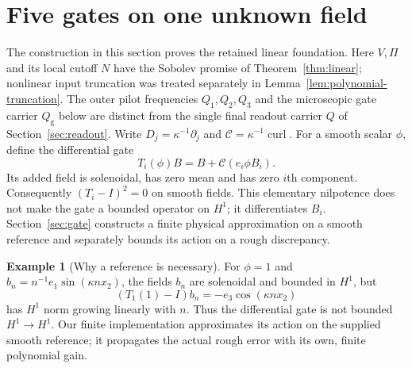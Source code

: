 \documentclass[11pt,a4paper]{amsart}
\theoremstyle{definition}
\newtheorem{example}[theorem]{Example}
\theoremstyle{remark}
\numberwithin{equation}{section}
\newcommand{\curl}{\operatorname{curl}}
\begin{document}
\section{Five gates on one unknown field}\label{sec:algebra}
The construction in this section proves the retained linear foundation. Here
$V,\Pi$ and its local cutoff $N$ have the Sobolev promise of
Theorem~\ref{thm:linear}; nonlinear input truncation was treated separately in
Lemma~\ref{lem:polynomial-truncation}. The outer pilot frequencies $Q_1,Q_2,Q_3$
and the microscopic gate carrier $Q_{\mathrm g}$ below are distinct from the
single final readout carrier $Q$ of Section~\ref{sec:readout}.
Write $D_j=\kappa^{-1}\partial_j$ and $\mathscr C=\kappa^{-1}\curl$.
For a smooth scalar $\phi$, define the differential gate
\begin{equation}\label{eq:gate}
 T_i(\phi)B=B+\mathscr C(e_i\phi B_i).
\end{equation}
Its added field is solenoidal, has zero mean and has zero $i$th component.
Consequently $(T_i-I)^2=0$ on smooth fields. This elementary nilpotence
does not make the gate a bounded operator on $H^1$; it differentiates $B_i$.
Section~\ref{sec:gate} constructs a finite physical approximation on a smooth
reference and separately bounds its action on a rough discrepancy.

\begin{example}[Why a reference is necessary]\label{ex:rough}
For $\phi=1$ and $b_n=n^{-1}e_1\sin(\kappa n x_2)$, the fields $b_n$ are
solenoidal and bounded in $H^1$, but
\[
 (T_1(1)-I)b_n=-e_3\cos(\kappa n x_2)
\]
has $H^1$ norm growing linearly with $n$. Thus the differential gate is
not bounded $H^1\to H^1$. Our finite implementation approximates its
action on the supplied smooth reference; it propagates the actual rough
error with its own, finite polynomial gain.
\end{example}
\end{document}
